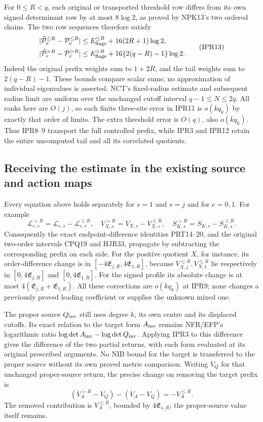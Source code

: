 \documentclass[11pt,a4paper]{article}
\begin{document}
For $0\le R<q$, each original or transported threshold row differs from its own
signed determinant row by at most $8\log2$, as proved by NPK13's
two ordered chains. The two row sequences therefore satisfy
\[
\begin{aligned}
 |\widehat{\mathcal P}_e^{\le R}-\mathcal P_e^{\le R}|
   &\le E_{\rm flags}^{\le R}+16(2R+1)\log2,\\
 |\widehat{\mathcal P}_e^{>R}-\mathcal P_e^{>R}|
   &\le E_{\rm flags}^{>R}+16\{2(q-R)-1\}\log2 .
\end{aligned}                                                       \tag{IPR13}
\]
Indeed the original prefix weights sum to $1+2R$, and the tail
weights sum to $2(q-R)-1$. These bounds compare scalar sums;
no approximation of individual eigenvalues is asserted.
NCT's fixed-radius estimate and subsequent radius limit are
uniform over the unchanged cutoff interval $q-1\le N\le2q$.
All ranks here are $O(j)$, so each finite three-site error in
IPR11 is $o(kq_k)$ by exactly that order of limits. The extra
threshold error is $O(q)$, also $o(kq_k)$. Thus IPR8--9 transport
the full controlled prefix, while IPR3 and IPR12 retain the
entire uncomputed tail and all its correlated quotients.

\subsection{Receiving the estimate in the existing source and action maps}
Every equation above holds separately for $s=1$ and $s=j$ and
for $e=0,1$. For example
\[
 \mathcal L_{e,s}^{>R}=\mathcal L_{e,s}-\mathcal L_{e,s}^{\le R},
 \quad V_{X,s}^{>R}=V_{X,s}-V_{X,s}^{\le R},\quad
 S_{K,s}^{>R}=S_{K,s}-S_{K,s}^{\le R}.                  \tag{IPR14}
\]
Consequently the exact endpoint-difference identities PRT14--20,
and the original two-order intervals CPQ19 and HJR33, propagate
by subtracting the corresponding prefix on each side. For the
positive quotient $X$, for instance, its order-difference change
is in $[-4\mathfrak E_{j,R},4\mathfrak E_{1,R}]$, because
$V_{X,j}^{\le R},V_{X,1}^{\le R}$ lie respectively in
$[0,4\mathfrak E_{j,R}]$ and $[0,4\mathfrak E_{1,R}]$.
For the signed profile its absolute change is at most
$4(\mathfrak E_{j,R}+\mathfrak E_{1,R})$. All these corrections
are $o(kq_k)$ at IPR9; none changes a previously proved leading
coefficient or supplies the unknown mixed one.

The proper source $Q_{\rm inv}$ still uses degree $k$, its own
centre and its displaced cutoffs. Its exact relation to the
target form $A_{\rm inv}$ remains NFR/EFP's logarithmic ratio
$\log\det A_{\rm inv}-\log\det Q_{\rm inv}$. Applying IPR3
to this difference gives the difference of the two partial
returns, with each form evaluated at its original prescribed
arguments. No NIB bound for the target is transferred to the
proper source without its own proved metric comparison.
Writing $V_Q$ for that unchanged proper-source return, the precise
change on removing the target prefix is
\[
 (V_A^{>R}-V_Q)-(V_A-V_Q)=-V_A^{\le R}.
\]
The removed contribution is $V_A^{\le R}$, bounded by
$4\mathfrak E_{s,R}$; the proper-source value itself remains.
\end{document}
